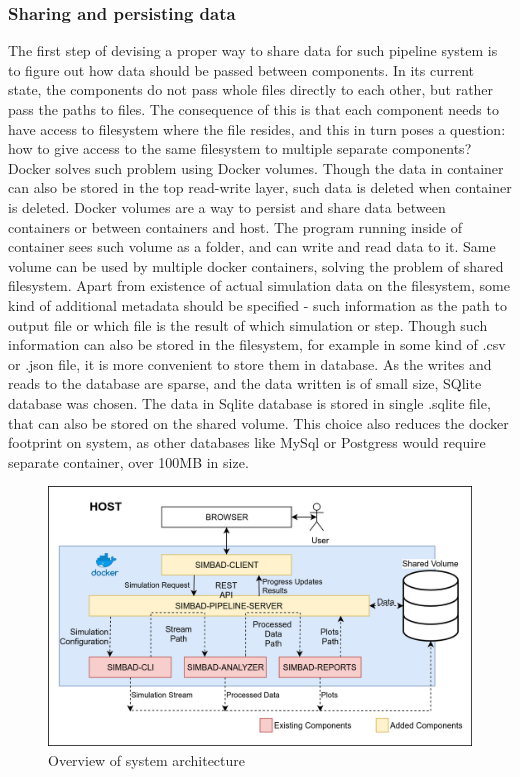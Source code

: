 \subsubsection{Sharing and persisting data}
The first step of devising a proper way to share data for such pipeline system is to figure out how data should be passed between components. In its current state, the components do not pass whole files directly to each other, but rather pass the paths to files. The consequence of this is that each component needs to have access to filesystem where the file resides, and this in turn poses a question: how to give access to the same filesystem to multiple separate components? Docker solves such problem using Docker volumes.  Though the data in container can also be stored in the top read-write layer, such data is deleted when container is deleted. Docker volumes are a way to persist and share data between containers or between containers and host. The program running inside of container sees such volume as a folder, and can write and read data to it. Same volume can be used by multiple docker containers, solving the problem of shared filesystem. Apart from existence of actual simulation data on the filesystem, some kind of additional metadata should be specified - such information as the path to output file or which file is the result of which simulation or step. Though such information can also be stored in the filesystem, for example in some kind of .csv or .json file, it is more convenient to store them in database. As the writes and reads to the database are sparse, and the data written is of small size, SQlite database was chosen. The data in Sqlite database is stored in single .sqlite file, that can also be stored on the shared volume. This choice also reduces the docker footprint on system, as other databases like MySql or Postgress would require separate container, over 100MB in size.
\begin{figure}[h!]
	\centering
		\includegraphics[width=0.9\linewidth]{diagrams/arch4.png}
	\caption{Overview of system architecture}
	\label{fig:arch4}
\end{figure}
